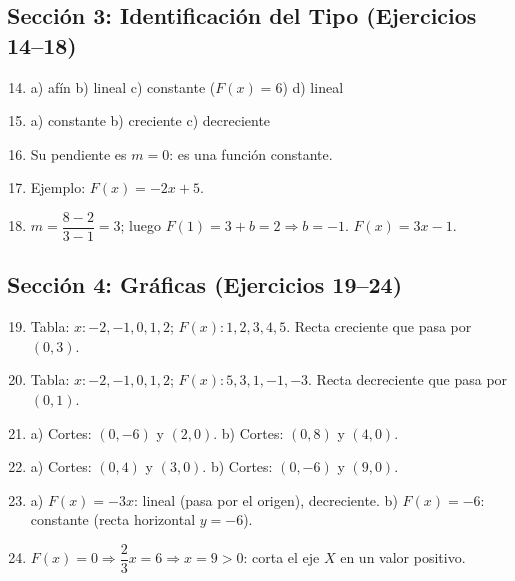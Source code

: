 \documentclass[12pt, letterpaper]{article}
\begin{document}
  \newpage

  \subsection*{Sección 3: Identificación del Tipo (Ejercicios 14--18)}

  \begin{enumerate}[leftmargin=*, label=\textbf{\arabic*.}]
    \setcounter{enumi}{13}
    \item a) afín \quad b) lineal \quad c) constante ($F(x) = 6$) \quad d) lineal

    \item a) constante \quad b) creciente \quad c) decreciente

    \item Su pendiente es $m = 0$: es una función constante.

    \item Ejemplo: $F(x) = -2x + 5$.

    \item $m = \dfrac{8 - 2}{3 - 1} = 3$; luego $F(1) = 3 + b = 2 \Rightarrow b = -1$. $F(x) = 3x - 1$.
  \end{enumerate}

  \newpage

  \subsection*{Sección 4: Gráficas (Ejercicios 19--24)}

  \begin{enumerate}[leftmargin=*, label=\textbf{\arabic*.}]
    \setcounter{enumi}{18}
    \item Tabla: $x: -2,-1,0,1,2$; $F(x): 1,2,3,4,5$. Recta creciente que pasa por $(0,3)$.

    \item Tabla: $x: -2,-1,0,1,2$; $F(x): 5,3,1,-1,-3$. Recta decreciente que pasa por $(0,1)$.

    \item a) Cortes: $(0,-6)$ y $(2,0)$. \quad b) Cortes: $(0,8)$ y $(4,0)$.

    \item a) Cortes: $(0,4)$ y $(3,0)$. \quad b) Cortes: $(0,-6)$ y $(9,0)$.

    \item a) $F(x) = -3x$: lineal (pasa por el origen), decreciente. \quad b) $F(x) = -6$: constante (recta horizontal $y = -6$).

    \item $F(x) = 0 \Rightarrow \dfrac{2}{3}x = 6 \Rightarrow x = 9 > 0$: corta el eje $X$ en un valor positivo.
  \end{enumerate}
\end{document}
